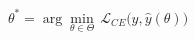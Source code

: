 \documentclass[preview]{standalone}
\begin{document}
\begin{align*}
\theta^* = \arg\min_{\theta \in \Theta}\,\mathcal{L}_{CE}\bigl(y,\hat y(\theta)\bigr)
\end{align*}
\end{document}
